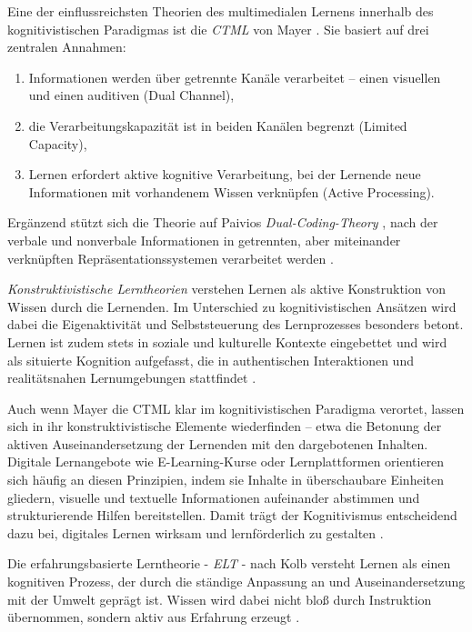 Eine der einflussreichsten Theorien des multimedialen Lernens innerhalb des kognitivistischen Paradigmas ist die \textit{\ac{CTML}} von Mayer \parencite[S.~102ff]{mayer_multimedia_2001}. Sie basiert auf drei zentralen Annahmen:
\begin{enumerate}
	\item Informationen werden über getrennte Kanäle verarbeitet – einen visuellen und einen auditiven (Dual Channel),
	\item die Verarbeitungskapazität ist in beiden Kanälen begrenzt (Limited Capacity),
	\item Lernen erfordert aktive kognitive Verarbeitung, bei der Lernende neue Informationen mit vorhandenem Wissen verknüpfen (Active Processing).
\end{enumerate}

Ergänzend stützt sich die Theorie auf Paivios \textit{Dual-Coding-Theory} \parencite[S.~102f]{paivia_dual_2006}, nach der verbale und nonverbale Informationen in getrennten, aber miteinander verknüpften Repräsentationssystemen verarbeitet werden \parencite[S.~66f]{furstenau_lehr-lern-theorien_2019}.

\textit{Konstruktivistische Lerntheorien} verstehen Lernen als aktive Konstruktion von Wissen durch die Lernenden. Im Unterschied zu kognitivistischen Ansätzen wird dabei die Eigenaktivität und Selbststeuerung des Lernprozesses besonders betont. Lernen ist zudem stets in soziale und kulturelle Kontexte eingebettet und wird als situierte Kognition aufgefasst, die in authentischen Interaktionen und realitätsnahen Lernumgebungen stattfindet \parencite[S.~1f]{furstenau_lehr-lern-theorien_2019}.

Auch wenn Mayer die \ac{CTML} klar im kognitivistischen Paradigma verortet, lassen sich in ihr konstruktivistische Elemente wiederfinden – etwa die Betonung der aktiven Auseinandersetzung der Lernenden mit den dargebotenen Inhalten. Digitale Lernangebote wie E-Learning-Kurse oder Lernplattformen orientieren sich häufig an diesen Prinzipien, indem sie Inhalte in überschaubare Einheiten gliedern, visuelle und textuelle Informationen aufeinander abstimmen und strukturierende Hilfen bereitstellen. Damit trägt der Kognitivismus entscheidend dazu bei, digitales Lernen wirksam und lernförderlich zu gestalten \parencites[S.~105--106]{mayer_multimedia_2001}{mayer_mayers_nodate}.

Die erfahrungsbasierte Lerntheorie - \textit{\ac{ELT}} - nach Kolb versteht Lernen als einen kognitiven Prozess, der durch die ständige Anpassung an und Auseinandersetzung mit der Umwelt geprägt ist. Wissen wird dabei nicht bloß durch Instruktion übernommen, sondern aktiv aus Erfahrung erzeugt \parencite[S.~30]{bergsteiner_kolbs_2010}.

